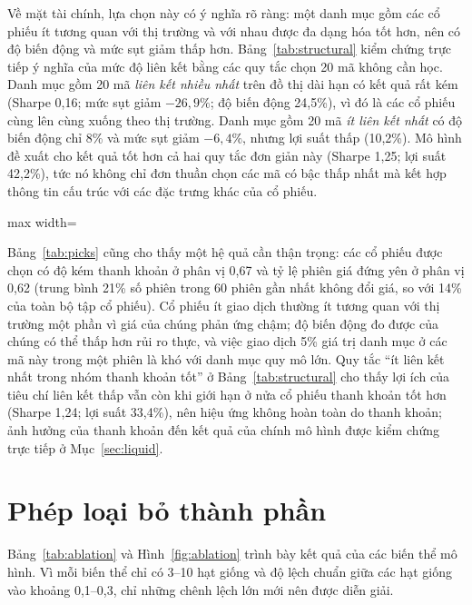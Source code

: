 Về mặt tài chính, lựa chọn này có ý nghĩa rõ ràng: một danh mục gồm các cổ phiếu ít tương quan với thị trường và với nhau được đa dạng hóa tốt hơn, nên có độ biến động và mức sụt giảm thấp hơn. Bảng~\ref{tab:structural} kiểm chứng trực tiếp ý nghĩa của mức độ liên kết bằng các quy tắc chọn 20 mã không cần học. Danh mục gồm 20 mã \emph{liên kết nhiều nhất} trên đồ thị dài hạn có kết quả rất kém (Sharpe 0,16; mức sụt giảm $-26{,}9\%$; độ biến động 24,5\%), vì đó là các cổ phiếu cùng lên cùng xuống theo thị trường. Danh mục gồm 20 mã \emph{ít liên kết nhất} có độ biến động chỉ 8\% và mức sụt giảm $-6{,}4\%$, nhưng lợi suất thấp (10,2\%). Mô hình đề xuất cho kết quả tốt hơn cả hai quy tắc đơn giản này (Sharpe 1,25; lợi suất 42,2\%), tức nó không chỉ đơn thuần chọn các mã có bậc thấp nhất mà kết hợp thông tin cấu trúc với các đặc trưng khác của cổ phiếu.

\begin{table}[ht]
\centering\small
\caption{Các quy tắc chọn 20 mã dựa trên cấu trúc đồ thị, không cần học (tập kiểm tra)}
\label{tab:structural}
\begin{adjustbox}{max width=\textwidth}\end{adjustbox}
\end{table}

Bảng~\ref{tab:picks} cũng cho thấy một hệ quả cần thận trọng: các cổ phiếu được chọn có độ kém thanh khoản ở phân vị 0,67 và tỷ lệ phiên giá đứng yên ở phân vị 0,62 (trung bình 21\% số phiên trong 60 phiên gần nhất không đổi giá, so với 14\% của toàn bộ tập cổ phiếu). Cổ phiếu ít giao dịch thường ít tương quan với thị trường một phần vì giá của chúng phản ứng chậm; độ biến động đo được của chúng có thể thấp hơn rủi ro thực, và việc giao dịch 5\% giá trị danh mục ở các mã này trong một phiên là khó với danh mục quy mô lớn. Quy tắc ``ít liên kết nhất trong nhóm thanh khoản tốt'' ở Bảng~\ref{tab:structural} cho thấy lợi ích của tiêu chí liên kết thấp vẫn còn khi giới hạn ở nửa cổ phiếu thanh khoản tốt hơn (Sharpe 1,24; lợi suất 33,4\%), nên hiệu ứng không hoàn toàn do thanh khoản; ảnh hưởng của thanh khoản đến kết quả của chính mô hình được kiểm chứng trực tiếp ở Mục~\ref{sec:liquid}.

\section{Phép loại bỏ thành phần}
\label{sec:ablation}

Bảng~\ref{tab:ablation} và Hình~\ref{fig:ablation} trình bày kết quả của các biến thể mô hình. Vì mỗi biến thể chỉ có 3--10 hạt giống và độ lệch chuẩn giữa các hạt giống vào khoảng 0,1--0,3, chỉ những chênh lệch lớn mới nên được diễn giải.

